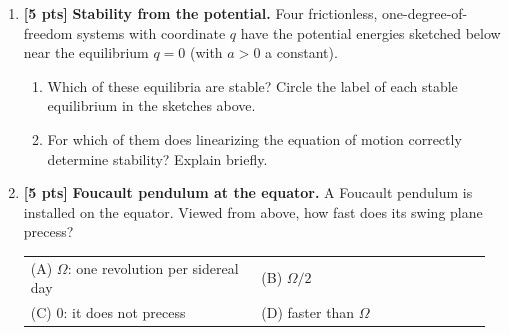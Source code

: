 \documentclass[11pt,letterpaper]{article}
\newcommand{\answerspace}[1]{\par\vspace{#1}}
\newcommand{\exampagebreak}{\newpage}
\newcommand{\pts}[1]{\textbf{[#1 pts]}}
\begin{document}
\begin{enumerate}[label=\textbf{I.\arabic*}, leftmargin=*, itemsep=1em]

\item \pts{5} \textbf{Stability from the potential.} Four frictionless, one-degree-of-freedom systems with coordinate $q$ have the potential energies sketched below near the equilibrium $q = 0$ (with $a > 0$ a constant).

\begin{center}
\end{center}

\begin{enumerate}[label=(\alph*)]
    \item Which of these equilibria are stable? Circle the label of each stable equilibrium in the sketches above.
    \item For which of them does linearizing the equation of motion correctly determine stability? Explain briefly.
\end{enumerate}
\answerspace{1.6in}

\item \pts{5} \textbf{Foucault pendulum at the equator.} A Foucault pendulum is installed on the equator. Viewed from above, how fast does its swing plane precess?

\smallskip
\begin{tabular}{@{}p{0.48\linewidth}p{0.48\linewidth}@{}}
(A) $\Omega$: one revolution per sidereal day & (B) $\Omega/2$ \\
(C) $0$: it does not precess & (D) faster than $\Omega$
\end{tabular}
\answerspace{1.0in}
\exampagebreak


\end{enumerate}
\end{document}
